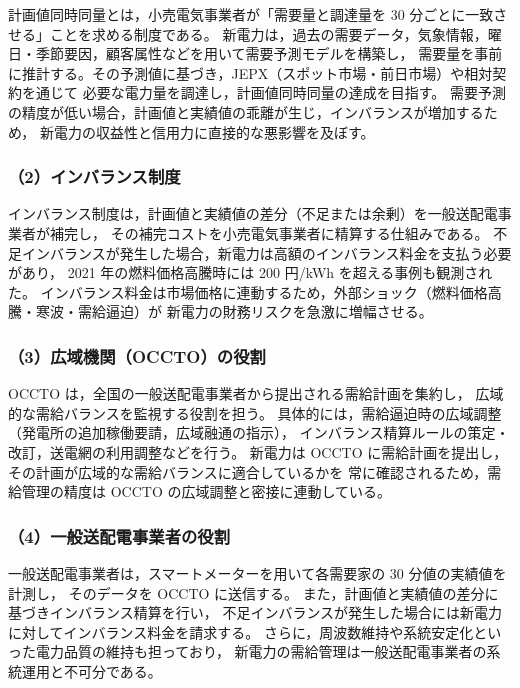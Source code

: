 計画値同時同量とは，小売電気事業者が「需要量と調達量を 30 分ごとに一致させる」ことを求める制度である。  
新電力は，過去の需要データ，気象情報，曜日・季節要因，顧客属性などを用いて需要予測モデルを構築し，
需要量を事前に推計する。その予測値に基づき，JEPX（スポット市場・前日市場）や相対契約を通じて
必要な電力量を調達し，計画値同時同量の達成を目指す。  
需要予測の精度が低い場合，計画値と実績値の乖離が生じ，インバランスが増加するため，
新電力の収益性と信用力に直接的な悪影響を及ぼす。

\subsubsection*{\hspace{2em}（2）インバランス制度}

インバランス制度は，計画値と実績値の差分（不足または余剰）を一般送配電事業者が補完し，
その補完コストを小売電気事業者に精算する仕組みである。  
不足インバランスが発生した場合，新電力は高額のインバランス料金を支払う必要があり，
2021 年の燃料価格高騰時には 200 円/kWh を超える事例も観測された。  
インバランス料金は市場価格に連動するため，外部ショック（燃料価格高騰・寒波・需給逼迫）が
新電力の財務リスクを急激に増幅させる。

\subsubsection*{\hspace{2em}（3）広域機関（OCCTO）の役割}

OCCTO は，全国の一般送配電事業者から提出される需給計画を集約し，
広域的な需給バランスを監視する役割を担う。  
具体的には，需給逼迫時の広域調整（発電所の追加稼働要請，広域融通の指示），
インバランス精算ルールの策定・改訂，送電網の利用調整などを行う。  
新電力は OCCTO に需給計画を提出し，その計画が広域的な需給バランスに適合しているかを
常に確認されるため，需給管理の精度は OCCTO の広域調整と密接に連動している。

\subsubsection*{\hspace{2em}（4）一般送配電事業者の役割}

一般送配電事業者は，スマートメーターを用いて各需要家の 30 分値の実績値を計測し，
そのデータを OCCTO に送信する。  
また，計画値と実績値の差分に基づきインバランス精算を行い，
不足インバランスが発生した場合には新電力に対してインバランス料金を請求する。  
さらに，周波数維持や系統安定化といった電力品質の維持も担っており，
新電力の需給管理は一般送配電事業者の系統運用と不可分である。


